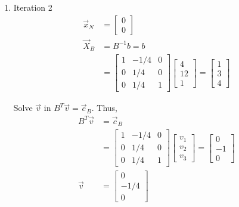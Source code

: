 \documentclass[a4paper,10pt]{article}
\begin{document}
\begin{enumerate}
\begin{enumerate}
{\begin{enumerate}
                \item Iteration 2
                    \begin{align}
                        \vec{x}_N &= \begin{bmatrix} 0 \\ 0 \end{bmatrix} \\
                        \vec{X}_B &= B^{-1}b = b \\
                        &= \begin{bmatrix} 1 & -1/4 & 0 \\ 0 & 1/4 & 0 \\ 0 & 1/4 & 1 \end{bmatrix} \begin{bmatrix} 4 \\ 12 \\ 1 \end{bmatrix} = \begin{bmatrix} 1 \\ 3 \\ 4 \end{bmatrix}
                    \end{align}
                    
                    Solve $\vec{v}$ in $B^T\vec{v} = \vec{c}_B$. Thus, 
                    \begin{align}
                        B^T\vec{v} &= \vec{c}_B \\
                        &= \begin{bmatrix} 1 & -1/4 & 0 \\ 0 & 1/4 & 0 \\ 0 & 1/4 & 1 \end{bmatrix} \begin{bmatrix} v_1 \\ v_2 \\ v_3 \end{bmatrix} = \begin{bmatrix} 0 \\ -1 \\ 0  \end{bmatrix} \\ 
                        \vec{v} &= \begin{bmatrix} 0 \\ -1/4 \\ 0 \end{bmatrix}
                    \end{align}


\end{enumerate}}
\end{enumerate}
\end{enumerate}
\end{document}
